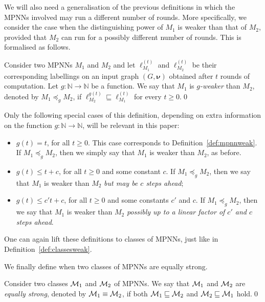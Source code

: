 We will also need a generalisation of the previous definitions in which the MPNNs involved may run a different number of rounds.  More specifically, we consider the case when the distinguishing power of $M_1$ is weaker than that of $M_2$, provided that $M_2$ can run for a possibly different number of rounds. This is formalised as follows.

\begin{definition}\normalfont
Consider two MPNNs $M_1$ and $M_2$ and let $\pmb{\ell}_{M_1}^{(t)}$ and $\pmb{\ell}_{M_2}^{(t)}$  be their corresponding labellings on an input graph $( G,\pmb{\nu})$ obtained after $t$ rounds of computation. Let $g:\mathbb{N}\to \mathbb{N}$ be a function. We say that $M_1$ is \textit{$g$-weaker} than $M_2$, denoted by $M_1\preceq_{g} M_2$, if 
$\pmb{\ell}_{M_2}^{g(t)}\sqsubseteq
\pmb{\ell}_{M_1}^{(t)}$ for every $t\geq 0$.\qed
\end{definition}

Only the following special cases of this definition, depending on extra information on the function $g:\mathbb{N}\to\mathbb{N}$, will be relevant in this paper:
\begin{itemize}
    \item $g(t)=t$, for all $t\geq 0$. This case corresponds to Definition~\ref{def:mpnnweak}. If $M_1\preceq_{g} M_2$, then we simply say that $M_1$ is weaker than $M_2$, as before.
    \item $g(t)\leq t+c$, for all $t\geq 0$ and some constant $c$. If $M_1\preceq_{g} M_2$, then we say that $M_1$ is weaker than $M_2$ \textit{but may be $c$ steps ahead};
    \item $g(t)\leq c't+c$, for all $t\geq 0$ and some constants $c'$ and $c$. If $M_1\preceq_{g} M_2$, then we say that $M_1$ is weaker than $M_2$ \textit{possibly up to a linear factor of $c'$ and $c$ steps ahead}.
\end{itemize}

One can again lift these definitions to classes of MPNNs, just like in Definition~\ref{def:classesweak}.

We finally define when two classes of MPNNs are equally strong.
\begin{definition}\normalfont
Consider two classes $\mathcal{M}_1$ and $\mathcal{M}_2$ of MPNNs. We say that 
$\mathcal{M}_1$ and $\mathcal{M}_2$ are \textit{equally strong}, denoted by $\mathcal{M}_1\equiv \mathcal{M}_2$, if 
both  $\mathcal{M}_1\sqsubseteq \mathcal{M}_2$ 
and  $\mathcal{M}_2\sqsubseteq \mathcal{M}_1$ hold.\qed\end{definition}

